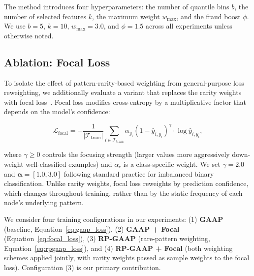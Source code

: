 The method introduces four hyperparameters: the number of quantile bins $b$, the number of selected features $k$, the maximum weight $w_{\text{max}}$, and the fraud boost $\phi$. We use $b = 5$, $k = 10$, $w_{\text{max}} = 3.0$, and $\phi = 1.5$ across all experiments unless otherwise noted.

\subsection{Ablation: Focal Loss}

To isolate the effect of pattern-rarity-based weighting from general-purpose loss reweighting, we additionally evaluate a variant that replaces the rarity weights with focal loss~\cite{lin2017focal}. Focal loss modifies cross-entropy by a multiplicative factor that depends on the model's confidence:

\begin{equation}
\mathcal{L}_{\text{focal}} = -\frac{1}{|\mathcal{T}_{\text{train}}|} \sum_{i \in \mathcal{T}_{\text{train}}} \alpha_{y_i} (1 - \hat{y}_{i, y_i})^{\gamma} \cdot \log \hat{y}_{i, y_i},
\label{eq:focal_loss}
\end{equation}

where $\gamma \geq 0$ controls the focusing strength (larger values more aggressively down-weight well-classified examples) and $\alpha_c$ is a class-specific weight. We set $\gamma = 2.0$ and $\boldsymbol{\alpha} = [1.0, 3.0]$ following standard practice for imbalanced binary classification. Unlike rarity weights, focal loss reweights by prediction confidence, which changes throughout training, rather than by the static frequency of each node's underlying pattern.

We consider four training configurations in our experiments: (1) \textbf{GAAP} (baseline, Equation~\ref{eq:gaap_loss}), (2) \textbf{GAAP + Focal} (Equation~\ref{eq:focal_loss}), (3) \textbf{RP-GAAP} (rare-pattern weighting, Equation~\ref{eq:rpgaap_loss}), and (4) \textbf{RP-GAAP + Focal} (both weighting schemes applied jointly, with rarity weights passed as sample weights to the focal loss). Configuration (3) is our primary contribution.
